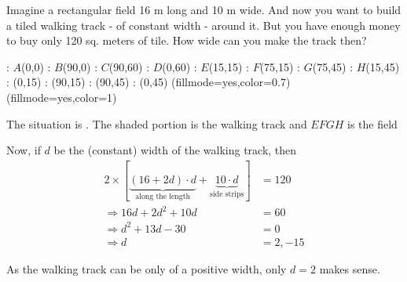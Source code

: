 

\question[2] Imagine a rectangular field 16 m long and 10 m wide. And now you want
to build a tiled walking track - of constant width - around it. But you have enough 
money to buy only 120 sq. meters of tile. How wide can you make the track then?


\ifprintanswers
  \begin{marginfigure}
      : $A$(0,0)
      : $B$(90,0)
      : $C$(90,60)
      : $D$(0,60)
      : $E$(15,15)
      : $F$(75,15)
      : $G$(75,45)
      : $H$(15,45)
      : (0,15)
      : (90,15)
      : (90,45)
      : (0,45)
    \figdrawbegin{}
      \figset (fillmode=yes,color=0.7)
      \figdrawline [100,101,102,103,100]
      \figset (fillmode=yes,color=1)
      \figdrawline [104,105,106,107,104]
    \figdrawend
    \centerline{\box\figBoxA}
  \end{marginfigure}
\fi 

\begin{solution}[\halfpage]
  The situation is \asif. The shaded portion is the walking track and $EFGH$ is the field

  Now, if $d$ be the (constant) width of the walking track, then
  \begin{align}
  	2\times\left[\underbrace{(16+2d)\cdot d}_{\text{along the length}} + 
  	\underbrace{10\cdot d}_{\text{side strips}} \right] &= 120 \\
  	\Rightarrow 16d + 2d^2 + 10d &= 60 \\
  	\Rightarrow d^2 + 13d - 30 &= 0 \\
  	\Rightarrow d &= 2, -15
  \end{align}
  
  As the walking track  can be only of a positive width, only $d = 2$ makes sense. 
\end{solution}

